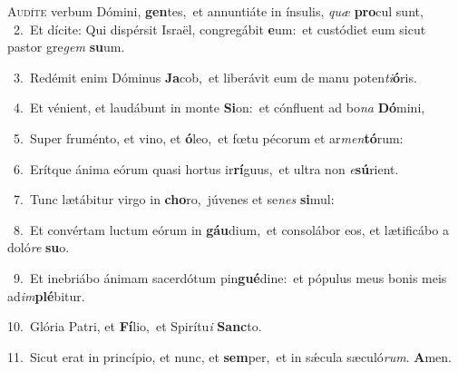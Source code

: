 \lettrine{\initial\textcolor{\initialcolor}{A}}{udíte} verbum Dómini, \textbf{gen}\-tes,~\star et annuntiáte in ínsulis, \textit{quæ} \textbf{pro}\-cul sunt,\\
{\numbfont\textcolor{\numbcolor}{~2.}}~Et dícite: Qui dispérsit Israël, congregábit \textbf{e}\-um:~\star et custódiet eum sicut pastor gre\textit{gem} \textbf{su}\-um.\par
{\numbfont\textcolor{\numbcolor}{~3.}}~Redémit enim Dóminus \textbf{Ja}\-cob,~\star et liberávit eum de manu poten\-\textit{ti}\-\textbf{ó}ris.\par
{\numbfont\textcolor{\numbcolor}{~4.}}~Et vénient, et laudábunt in monte \textbf{Si}\-on:~\star et cónfluent ad bo\textit{na} \textbf{Dó}\-mini,\par
{\numbfont\textcolor{\numbcolor}{~5.}}~Super fruménto, et vino, et \textbf{ó}\-leo,~\star et fœtu pécorum et ar\-\textit{men}\-\textbf{tó}rum:\par
{\numbfont\textcolor{\numbcolor}{~6.}}~Erítque ánima eórum quasi hortus ir\-\textbf{rí}\-guus,~\star et ultra non \textit{e}\-\textbf{sú}rient.\par
{\numbfont\textcolor{\numbcolor}{~7.}}~Tunc lætábitur virgo in \textbf{cho}\-ro,~\star júvenes et se\textit{nes} \textbf{si}\-mul:\par
{\numbfont\textcolor{\numbcolor}{~8.}}~Et convértam luctum eórum in \textbf{gáu}\-dium,~\star et consolábor eos, et lætificábo a doló\textit{re} \textbf{su}\-o.\par
{\numbfont\textcolor{\numbcolor}{~9.}}~Et inebriábo ánimam sacerdótum pin\-\textbf{gué}\-dine:~\star et pópulus meus bonis meis ad\-\textit{im}\-\textbf{plé}bitur.\par
{\numbfont\textcolor{\numbcolor}{10.}}~Glória Patri, et \textbf{Fí}\-lio,~\star et Spirítu\textit{i} \textbf{Sanc}\-to.\par
{\numbfont\textcolor{\numbcolor}{11.}}~Sicut erat in princípio, et nunc, et \textbf{sem}\-per,~\star et in sǽcula sæculó\-\textit{rum}\-. \textbf{A}\-men.\par
